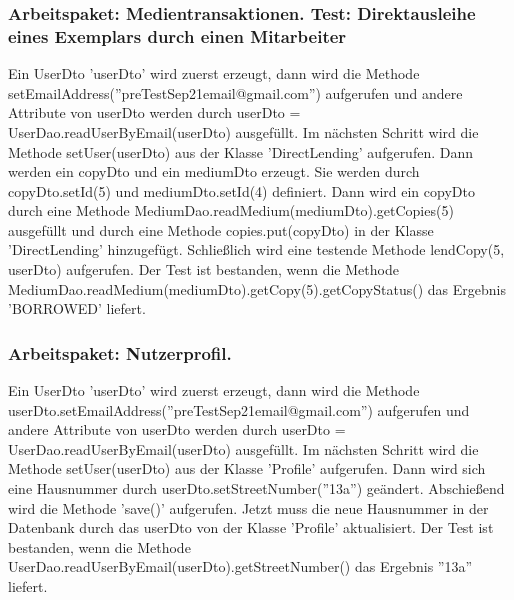 \documentclass{article}
\begin{document}
\subsubsection{Arbeitspaket: Medientransaktionen. Test: Direktausleihe eines Exemplars durch einen Mitarbeiter}
Ein UserDto 'userDto' wird zuerst erzeugt, dann wird die Methode \linebreak setEmailAddress(''preTestSep21email@gmail.com'') aufgerufen und andere Attribute von userDto werden durch userDto = UserDao.readUserByEmail(userDto) ausgefüllt. Im nächsten Schritt wird die Methode setUser(userDto) aus der Klasse 'DirectLending' aufgerufen. Dann werden ein copyDto und ein mediumDto erzeugt. Sie werden durch copyDto.setId(5) und mediumDto.setId(4) definiert. Dann wird ein copyDto durch eine Methode MediumDao.readMedium(mediumDto).getCopies(5) ausgefüllt und durch eine Methode copies.put(copyDto) in der Klasse 'DirectLending' hinzugefügt. Schließlich wird eine testende Methode lendCopy(5, userDto) aufgerufen. Der Test ist bestanden, wenn die Methode MediumDao.readMedium(mediumDto).getCopy(5).getCopyStatus() das Ergebnis 'BORROWED' liefert.

\subsubsection{Arbeitspaket: Nutzerprofil.}
Ein UserDto 'userDto' wird zuerst erzeugt, dann wird die Methode \linebreak userDto.setEmailAddress(''preTestSep21email@gmail.com'') aufgerufen und andere Attribute von userDto werden durch userDto = UserDao.readUserByEmail(userDto) ausgefüllt. Im nächsten \linebreak Schritt wird die Methode setUser(userDto) aus der Klasse 'Profile' aufgerufen. Dann wird sich eine Hausnummer durch userDto.setStreetNumber(''13a'') geändert. Abschießend wird die Methode 'save()' aufgerufen. Jetzt muss die neue Hausnummer in der Datenbank durch das userDto von der Klasse 'Profile' aktualisiert. Der Test ist bestanden, wenn die Methode \linebreak UserDao.readUserByEmail(userDto).getStreetNumber() das Ergebnis ''13a'' liefert.
\end{document}

